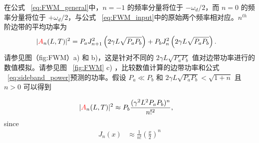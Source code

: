 在公式 ~\ref{eq:FWM_general}中，$n=-1$ 的频率分量将位于 $-\omega_d/2$，而 $n=0$ 的频率分量将位于 $+\omega_d/2$，与公式 ~\ref{eq:FWM_input}中的原始两个频率相对应。$n^{th}$ 阶边带的平均功率为
\begin{align}
\label{eq:sideband_power}
    |\textcolor{red}{A}_n(L,T)|^2 &= P_aJ^2_{n+1}\left(2\gamma L \sqrt{P_aP_b}\right)+P_bJ^2_{n}\left(2\gamma L \sqrt{P_aP_b}\right).
\end{align}
请参见图（fig:FWM）a) 和 b)，这是针对不同的 $2\gamma L \sqrt{P_aP_b}$ 值对边带功率进行的数值模拟。请参见图 ~\ref{fig:FWM} c) ，比较数值计算的边带功率和公式 ~\ref{eq:sideband_power}预测的功率。假设 $P_a\ll P_b$ 和 $2\gamma L\sqrt{P_aP_b}<\sqrt{1+n}$ 且 $n>0$ 可以得到

\begin{align}
\label{eq:sideband_approx}
    |\textcolor{red}{A}_n(L,T)|^2 &\approx P_b\frac{(\gamma^2 L^2P_aP_b)^{n}}{n!^2},
\end{align}
since
\begin{align}
\label{eq:Bessel_approx}
    J_n(x)&\approx \frac{1}{n!}\left(\frac{x}{2}\right)^n
\end{align}

